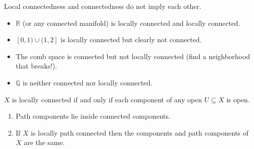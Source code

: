 \documentclass[11pt]{scrartcl}
\providecommand{\QQ}{\mathbb Q}
\providecommand{\RR}{\mathbb R}
\providecommand{\ii}{\item}
\begin{document}
\begin{example}
    Local connectedness and connectedness do not imply each other.
    \begin{itemize}
        \ii $\RR$ (or any connected manifold) is locally connected
	and locally connected.
	\ii $[0,1)\cup(1,2]$ is locally connected
	but clearly not connected.
	\ii The comb space is connected but not locally connected
	(find a neighborhood that breaks!).
	\ii $\QQ$ is neither connected nor locally connected.
    \end{itemize}
\end{example}

\begin{theorem}
    \label{thm:lc-iff-components-of-open-are-open}
    $X$ is locally connected if and only if each component of
    any open $U\subseteq X$ is open.
\end{theorem}

\begin{theorem}
    \label{thm:path-component-props}
    \begin{enumerate}[(1)]
        \ii Path components lie inside connected components.
	\ii If $X$ is locally path connected then the components
	and path components of $X$ are the same.
    \end{enumerate}
\end{theorem}
\end{document}
